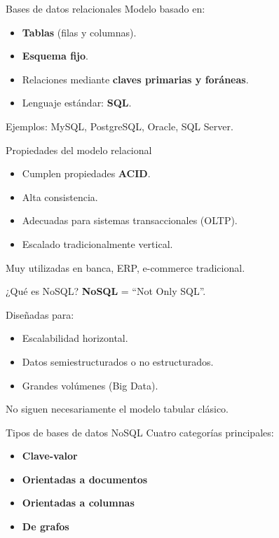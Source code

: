 \documentclass{beamer}
\begin{document}
\begin{frame}{Bases de datos relacionales}
Modelo basado en:
\begin{itemize}
    \item \textbf{Tablas} (filas y columnas).
    \item \textbf{Esquema fijo}.
    \item Relaciones mediante \textbf{claves primarias y foráneas}.
    \item Lenguaje estándar: \textbf{SQL}.
\end{itemize}

\medskip
Ejemplos: MySQL, PostgreSQL, Oracle, SQL Server.
\end{frame}

\begin{frame}{Propiedades del modelo relacional}
\begin{itemize}
    \item Cumplen propiedades \textbf{ACID}.
    \item Alta consistencia.
    \item Adecuadas para sistemas transaccionales (OLTP).
    \item Escalado tradicionalmente vertical.
\end{itemize}

\medskip
Muy utilizadas en banca, ERP, e-commerce tradicional.
\end{frame}

\begin{frame}{¿Qué es NoSQL?}
\textbf{NoSQL} = “Not Only SQL”.

Diseñadas para:
\begin{itemize}
    \item Escalabilidad horizontal.
    \item Datos semiestructurados o no estructurados.
    \item Grandes volúmenes (Big Data).
\end{itemize}

\medskip
No siguen necesariamente el modelo tabular clásico.
\end{frame}

\begin{frame}{Tipos de bases de datos NoSQL}
Cuatro categorías principales:

\begin{itemize}
    \item \textbf{Clave-valor}
    \item \textbf{Orientadas a documentos}
    \item \textbf{Orientadas a columnas}
    \item \textbf{De grafos}
\end{itemize}
\end{frame}
\end{document}
